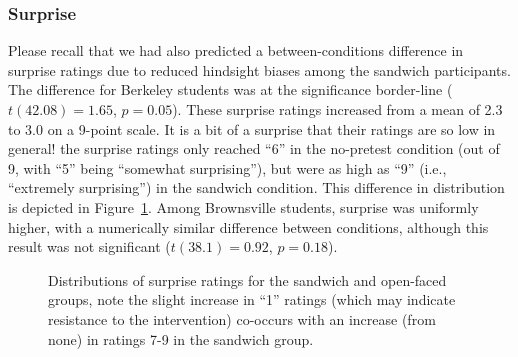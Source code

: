 \subsubsection{Surprise}

Please recall that we had also predicted a between-conditions difference in
surprise ratings due to reduced hindsight biases among the sandwich
participants. The difference for Berkeley students was at the significance
border-line ($t(42.08) = 1.65$, $p = 0.05$). These surprise ratings increased
from a mean of 2.3 to 3.0 on a 9-point scale. It is a bit of a surprise that
their ratings are so low in general! the surprise ratings only reached “6” in
the no-pretest condition (out of 9, with “5” being “somewhat surprising”), but
were as high as “9” (i.e., “extremely surprising”) in the sandwich condition.
This difference in distribution is depicted in
Figure~\ref{fig:uc-mech-surprise}.  Among Brownsville students, surprise was
uniformly higher, with a numerically similar difference between conditions,
although this result was not significant ($t(38.1) = 0.92$, $p = 0.18$). 

\begin{figure}[h]
    \centering
    \caption{Distributions of surprise ratings for the sandwich and open-faced
        groups, note the slight increase in ``1'' ratings (which may indicate
        resistance to the intervention) co-occurs with an increase (from none)
        in ratings 7-9 in the sandwich group.}
    \label{fig:uc-mech-surprise}
\end{figure}

